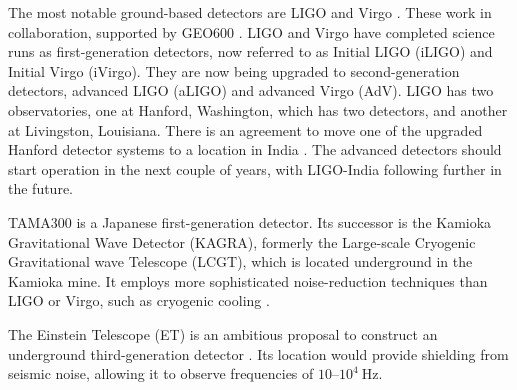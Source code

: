 The most notable ground-based detectors are LIGO and Virgo \citep{Abramovici1992,Acernese2008a}. These work in collaboration, supported by GEO600 \citep{Willke2002}. LIGO and Virgo have completed science runs as first-generation detectors, now referred to as Initial LIGO (iLIGO) and Initial Virgo (iVirgo). They are now being upgraded to second-generation detectors, advanced LIGO (aLIGO) and advanced Virgo (AdV). LIGO has two observatories, one at Hanford, Washington, which has two detectors, and another at Livingston, Louisiana. There is an agreement to move one of the upgraded Hanford detector systems to a location in India \citep{LIGO-India,Unnikrishnan2013}. The advanced detectors should start operation in the next couple of years, with LIGO-India following further in the future.

TAMA300 is a Japanese first-generation detector. Its successor is the Kamioka Gravitational Wave Detector (KAGRA), formerly the Large-scale Cryogenic Gravitational wave Telescope (LCGT), which is located underground in the Kamioka mine. It employs more sophisticated noise-reduction techniques than LIGO or Virgo, such as cryogenic cooling \citep{2012CQGra..29l4007S}.

The Einstein Telescope (ET) is an ambitious proposal to construct an underground third-generation detector \citep{Punturo2010,Sathyaprakash2012}. Its location would provide shielding from seismic noise, allowing it to observe frequencies of $10$--$10^4~\mathrm{Hz}$. 

